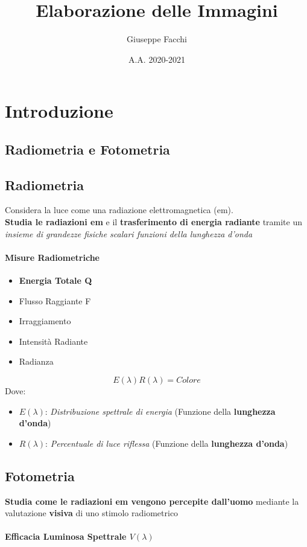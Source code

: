 \documentclass[12pt]{article}
\title{Elaborazione delle Immagini}
\author{Giuseppe Facchi}
\date{A.A. 2020-2021}
\begin{document}
\maketitle
\newpage
\tableofcontents
\newpage

\section{Introduzione}
\subsection{Radiometria e Fotometria}
\subsection{Radiometria}

Considera la luce come una radiazione elettromagnetica (em).
\\ \textbf{Studia le radiazioni em} e il \textbf{trasferimento di energia radiante} tramite un \textit{insieme di grandezze fisiche scalari funzioni della lunghezza d'onda}
\paragraph{Misure Radiometriche}
\begin{itemize}
    \item \textbf{Energia Totale Q}
    \item Flusso Raggiante F
    \item Irraggiamento
    \item Intensità Radiante
    \item Radianza
\end{itemize}
$$E(\lambda)R(\lambda)=Colore$$
Dove:
\begin{itemize}[label=]
    \item $E(\lambda)$: \textit{Distribuzione spettrale di energia} (Funzione della \textbf{lunghezza d'onda})
    \item $R(\lambda)$: \textit{Percentuale di luce riflessa} (Funzione della \textbf{lunghezza d'onda})
\end{itemize}
\subsection{Fotometria}
\textbf{Studia come le radiazioni em vengono percepite dall'uomo} mediante la valutazione \textbf{visiva} di uno stimolo radiometrico
\paragraph{Efficacia Luminosa Spettrale $V(\lambda)$}
\end{document}
